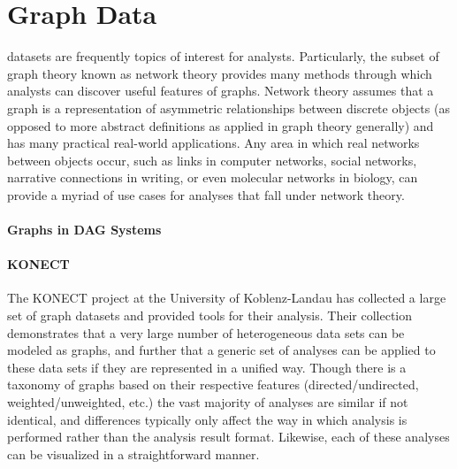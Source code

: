 \section{Graph Data}
\label{sec:graph_data}
 datasets are frequently topics of interest for analysts. Particularly, the subset of graph theory known as network theory provides many methods through which analysts can discover useful features of graphs. Network theory assumes that a graph is a representation of asymmetric relationships between discrete objects (as opposed to more abstract definitions as applied in graph theory generally) and has many practical real-world applications. Any area in which real networks between objects occur, such as links in computer networks, social networks, narrative connections in writing,  or even molecular networks in biology, can provide a myriad of use cases for analyses that fall under network theory. 

\paragraph{Graphs in DAG Systems}

\paragraph{KONECT}
The KONECT project \citep{Kunegis2013} at the University of Koblenz-Landau has collected a large set of graph datasets and provided tools for their analysis. Their collection demonstrates that a very large number of heterogeneous data sets can be modeled as graphs, and further that a generic set of analyses can be applied to these data sets if they are represented in a unified way. Though there is a taxonomy of graphs based on their respective features (directed/undirected, weighted/unweighted, etc.) the vast majority of analyses are similar if not identical, and differences typically only affect the way in which analysis is performed rather than the analysis result format. Likewise, each of these analyses can be visualized in a straightforward manner.

